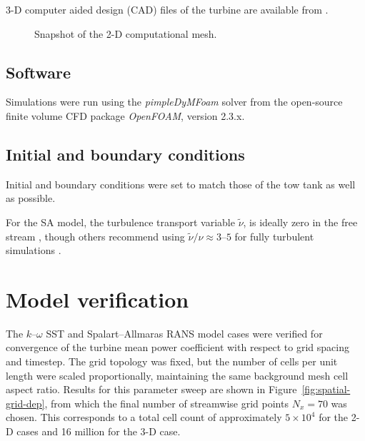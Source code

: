 \documentclass[aip,graphicx]{revtex4-1}
\begin{document}
3-D computer aided design (CAD) files of the turbine are available from
\cite{Bachant2014-RVAT-CAD}.

\begin{figure}[ht]
\caption{Snapshot of the 2-D computational mesh.}
\label{fig:mesh}
\end{figure}

\subsection{Software}

Simulations were run using the \textit{pimpleDyMFoam} solver from the
open-source finite volume CFD package \textit{OpenFOAM}, version 2.3.x.

\subsection{Initial and boundary conditions}

Initial and boundary conditions were set to match those of the tow tank as well
as possible. 

For the SA model, the turbulence transport variable $\tilde{\nu}$, is ideally
zero in the free stream \cite{Spalart1992}, though others recommend using
$\tilde{\nu}/\nu \approx 3$--$5$ for fully turbulent simulations
\cite{Spalart2007}. 

\section{Model verification}

The $k$--$\omega$ SST and Spalart--Allmaras RANS model cases were verified for
convergence of the turbine mean power coefficient with respect to grid spacing
and timestep. The grid topology was fixed, but the number of cells per unit
length were scaled proportionally, maintaining the same background mesh cell
aspect ratio. Results for this parameter sweep are shown in
Figure~\ref{fig:spatial-grid-dep}, from which the final number of streamwise
grid points $N_x = 70$ was chosen. This corresponds to a total cell count of
approximately $5 \times 10^4$ for the 2-D cases and 16 million for the 3-D case.
\end{document}
